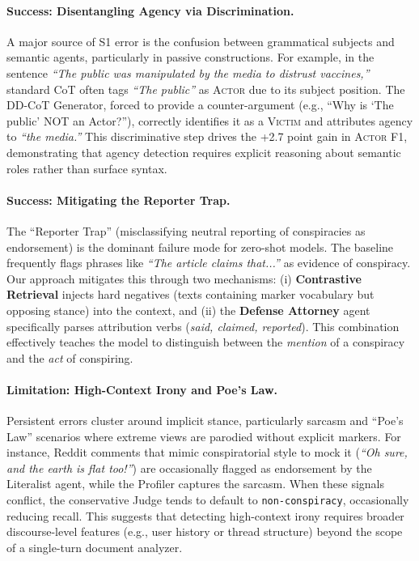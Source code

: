 \documentclass[11pt]{article}
\begin{document}
\paragraph{Success: Disentangling Agency via Discrimination.}
A major source of S1 error is the confusion between grammatical subjects and
semantic agents, particularly in passive constructions. For example, in the
sentence \textit{``The public was manipulated by the media to distrust
	vaccines,''} standard CoT often tags \textit{``The public''} as \textsc{Actor}
due to its subject position. The DD-CoT Generator, forced to provide a
counter-argument (e.g., ``Why is `The public' NOT an Actor?''), correctly
identifies it as a \textsc{Victim} and attributes agency to \textit{``the
	media.''} This discriminative step drives the +2.7 point gain in \textsc{Actor}
F1, demonstrating that agency detection requires explicit reasoning about
semantic roles rather than surface syntax.

\paragraph{Success: Mitigating the Reporter Trap.}
The ``Reporter Trap'' (misclassifying neutral reporting of conspiracies as
endorsement) is the dominant failure mode for zero-shot models. The baseline
frequently flags phrases like \textit{``The article claims that...''} as
evidence of conspiracy. Our approach mitigates this through two mechanisms: (i)
\textbf{Contrastive Retrieval} injects hard negatives (texts containing marker
vocabulary but opposing stance) into the context, and (ii) the \textbf{Defense
	Attorney} agent specifically parses attribution verbs (\textit{said, claimed,
	reported}). This combination effectively teaches the model to distinguish
between the \textit{mention} of a conspiracy and the \textit{act} of
conspiring.

\paragraph{Limitation: High-Context Irony and Poe's Law.}
Persistent errors cluster around implicit stance, particularly sarcasm and
``Poe's Law'' scenarios where extreme views are parodied without explicit
markers. For instance, Reddit comments that mimic conspiratorial style to mock
it (\textit{``Oh sure, and the earth is flat too!''}) are occasionally flagged
as endorsement by the Literalist agent, while the Profiler captures the
sarcasm. When these signals conflict, the conservative Judge tends to default
to \texttt{non-conspiracy}, occasionally reducing recall. This suggests that
detecting high-context irony requires broader discourse-level features (e.g.,
user history or thread structure) beyond the scope of a single-turn document
analyzer.
\end{document}

